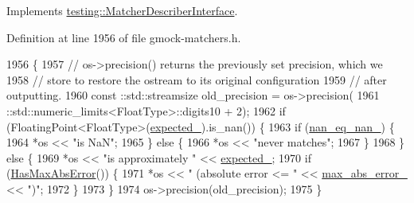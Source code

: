 Implements \hyperlink{classtesting_1_1MatcherDescriberInterface_ad9f861588bd969b6e3e717f13bb94e7b}{testing\+::\+Matcher\+Describer\+Interface}.



Definition at line 1956 of file gmock-\/matchers.\+h.


\begin{DoxyCode}
1956                                                   \{
1957       \textcolor{comment}{// os->precision() returns the previously set precision, which we}
1958       \textcolor{comment}{// store to restore the ostream to its original configuration}
1959       \textcolor{comment}{// after outputting.}
1960       const ::std::streamsize old\_precision = os->precision(
1961           ::std::numeric\_limits<FloatType>::digits10 + 2);
1962       \textcolor{keywordflow}{if} (FloatingPoint<FloatType>(\hyperlink{classtesting_1_1internal_1_1FloatingEqMatcher_1_1Impl_ab7d6c6eed79e4bd83fc3758bb53395eb}{expected\_}).is\_nan()) \{
1963         \textcolor{keywordflow}{if} (\hyperlink{classtesting_1_1internal_1_1FloatingEqMatcher_1_1Impl_a77073561281e81e81ac8c870a0689e7a}{nan\_eq\_nan\_}) \{
1964           *os << \textcolor{stringliteral}{"is NaN"};
1965         \} \textcolor{keywordflow}{else} \{
1966           *os << \textcolor{stringliteral}{"never matches"};
1967         \}
1968       \} \textcolor{keywordflow}{else} \{
1969         *os << \textcolor{stringliteral}{"is approximately "} << \hyperlink{classtesting_1_1internal_1_1FloatingEqMatcher_1_1Impl_ab7d6c6eed79e4bd83fc3758bb53395eb}{expected\_};
1970         \textcolor{keywordflow}{if} (\hyperlink{classtesting_1_1internal_1_1FloatingEqMatcher_1_1Impl_a3e3539f59004154b8af47a87a83a2d59}{HasMaxAbsError}()) \{
1971           *os << \textcolor{stringliteral}{" (absolute error <= "} << \hyperlink{classtesting_1_1internal_1_1FloatingEqMatcher_1_1Impl_afec03a9fc571d9907979f088ff5e55e5}{max\_abs\_error\_} << \textcolor{stringliteral}{")"};
1972         \}
1973       \}
1974       os->precision(old\_precision);
1975     \}
\end{DoxyCode}
\mbox{\label{classtesting_1_1internal_1_1FloatingEqMatcher_1_1Impl_a03db98ebe05c5af9b61f20607cbad630}} 
